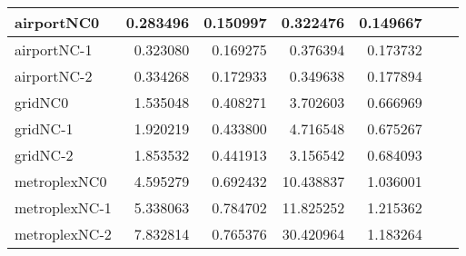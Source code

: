 \begin{longtable}{|l|r|r|r|r|r|r|}
airportNC0 & 0.283496 & 0.150997 & 0.322476 & 0.149667 \\ \hline
airportNC-1 & 0.323080 & 0.169275 & 0.376394 & 0.173732 \\ \hline
airportNC-2 & 0.334268 & 0.172933 & 0.349638 & 0.177894 \\ \hline
gridNC0 & 1.535048 & 0.408271 & 3.702603 & 0.666969 \\ \hline
gridNC-1 & 1.920219 & 0.433800 & 4.716548 & 0.675267 \\ \hline
gridNC-2 & 1.853532 & 0.441913 & 3.156542 & 0.684093 \\ \hline
metroplexNC0 & 4.595279 & 0.692432 & 10.438837 & 1.036001 \\ \hline
metroplexNC-1 & 5.338063 & 0.784702 & 11.825252 & 1.215362 \\ \hline
metroplexNC-2 & 7.832814 & 0.765376 & 30.420964 & 1.183264 \\ \hline
\end{longtable}
